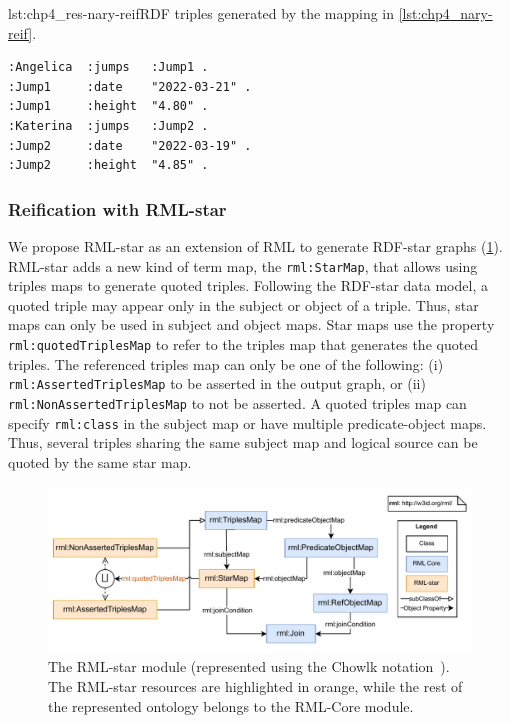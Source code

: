 \begin{minipage}{\linewidth}
\begin{captionedlisting}{lst:chp4_res-nary-reif}{RDF triples generated by the mapping in \cref{lst:chp4_nary-reif}.}
\centering
\begin{multicols}{2}
{\begin{lstlisting}[basicstyle=\ttfamily\small,label={list:example1},columns=flexible]
:Angelica  :jumps   :Jump1 .
:Jump1     :date    "2022-03-21" .
:Jump1     :height  "4.80" .
:Katerina  :jumps   :Jump2 .
:Jump2     :date    "2022-03-19" .
:Jump2     :height  "4.85" .
\end{lstlisting}}
\end{multicols}
\end{captionedlisting}
\end{minipage}




\subsubsection{Reification with RML-star}



We propose RML-star as an extension of RML to generate \mbox{RDF-star} graphs (\cref{fig:chp4_rml-star}). 
\mbox{RML-star} adds a new kind of term map, the \texttt{rml:StarMap}, that allows using triples maps to generate quoted triples. 
Following the \mbox{RDF-star} data model,
a quoted triple may appear only in the subject or object of a triple.
Thus, star maps can only be used in subject and object maps.
Star maps use the property \texttt{rml:quotedTriplesMap} to refer to the triples map that generates the quoted triples. 
The referenced triples map can only be one of the following: (i) \texttt{rml:AssertedTriplesMap} to be asserted in the output graph, or (ii) \texttt{rml:NonAssertedTriplesMap} to not be asserted. A quoted triples map can specify \texttt{rml:class} in the subject map or have multiple predicate-object maps.
Thus, several triples sharing the same subject map and logical source can be quoted by the same star map.

\begin{figure}[!t]
\centering
\includegraphics[width=1\linewidth]{figures/rml-star_diagram.pdf}
\caption[The RML-star module]{The \mbox{RML-star} module (represented using the Chowlk notation~\citep{feria2022chowlk}). The RML-star resources are highlighted in orange, while the rest of the represented ontology belongs to the RML-Core module.}
\label{fig:chp4_rml-star}
\end{figure}



